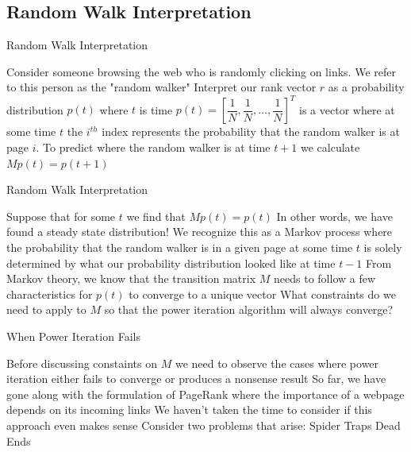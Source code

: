\documentclass{beamer}
\begin{document}
\subsection{Random Walk Interpretation}
\begin{frame}[t]{Random Walk Interpretation}
    \begin{outline}
        \1 Consider someone browsing the web who is randomly clicking on links. We refer to this person as the "random walker" 
        \1 Interpret our rank vector $r$ as a probability distribution $p(t)$ where $t$ is time
        \1 $p(t) = \left[ \dfrac{1}{N}, \dfrac{1}{N}, \ldots, \dfrac{1}{N} \right]^T$ is a vector where at some time $t$ the $i^{th}$ index represents the probability that the random walker is at page $i$.
        \1 To predict where the random walker is at time $t + 1$ we calculate $Mp(t) = p(t + 1)$
    \end{outline}
\end{frame}

\begin{frame}[t]{Random Walk Interpretation}
\begin{outline}
    \1 Suppose that for some $t$ we find that $Mp(t) = p(t)$
    \1 In other words, we have found a steady state distribution!
    \1 We recognize this as a Markov process where the probability that the random walker is in a given page at some time $t$ is solely determined by what our probability distribution looked like at time $t-1$
    \1 From Markov theory, we know that the transition matrix $M$ needs to follow a few characteristics for $p(t)$ to converge to a unique vector
    \1 What constraints do we need to apply to $M$ so that the power iteration algorithm will always converge?
\end{outline}   
\end{frame}

\begin{frame}[t]{When Power Iteration Fails}
    \begin{outline}
        \1 Before discussing constaints on $M$ we need to observe the cases where power iteration either fails to converge or produces a nonsense result
        \1 So far, we have gone along with the formulation of PageRank where the importance of a webpage depends on its incoming links
        \1 We haven't taken the time to consider if this approach even makes sense
        \1 Consider two problems that arise:
            \2 Spider Traps
            \2 Dead Ends
    \end{outline}
\end{frame}
\end{document}
